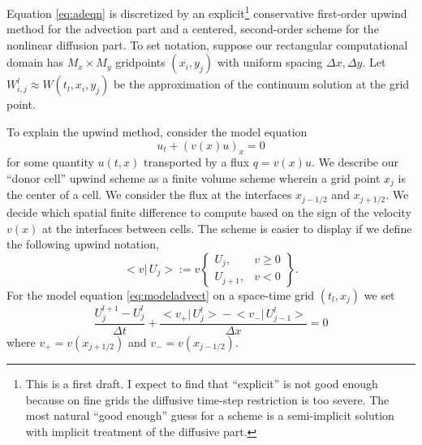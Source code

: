 \documentclass[12pt,final]{amsart}%
\newcommand{\Wlij}{W^l_{i,j}}
\begin{document}
Equation \eqref{eq:adeqn} is discretized by an explicit\footnote{This is a first draft.  I expect to find that ``explicit'' is not good enough because on fine grids the diffusive time-step restriction is too severe.  The most natural ``good enough'' guess for a scheme is a semi-implicit solution with implicit treatment of the diffusive part.} conservative first-order upwind method for the advection part and a centered, second-order scheme for the nonlinear diffusion part.  To set notation, suppose our rectangular computational domain has $M_x \times M_y$ gridpoints $(x_i,y_j)$ with uniform spacing $\Delta x,\Delta y$.  Let $\Wlij \approx W(t_l,x_i,y_j)$ be the approximation of the continuum solution at the grid point.

To explain the upwind method, consider the model equation
\begin{equation} \label{eq:modeladvect}
u_t + (v(x) u)_x = 0
\end{equation}
for some quantity $u(t,x)$ transported by a flux $q = v(x) u$.  We describe our ``donor cell'' upwind scheme as a finite volume scheme \citep{LeVeque} wherein a grid point $x_j$ is the center of a cell.  We consider the flux at the interfaces $x_{j-1/2}$ and $x_{j+1/2}$.  We decide which spatial finite difference to compute based on the sign of the velocity $v(x)$ at the interfaces between cells.  The scheme is easier to display if we define the following upwind notation,
\newcommand{\up}[2]{\big<#1\big|\,#2\big>}
	$$\up{v}{U_j} := v \begin{Bmatrix} U_j, & v \ge 0 \\ U_{j+1}, & v < 0 \end{Bmatrix}.$$
For the model equation \eqref{eq:modeladvect} on a space-time grid $(t_l,x_j)$ we set
\begin{equation}\label{eq:modelfdadvect}
\frac{U_j^{l+1} - U_j^l}{\Delta t} + \frac{\up{v_+}{U_j^l} - \up{v_-}{U_{j-1}^l}}{\Delta x} = 0
\end{equation}
where $v_+ = v(x_{j+1/2})$ and $v_-=v(x_{j-1/2})$.
\end{document}

